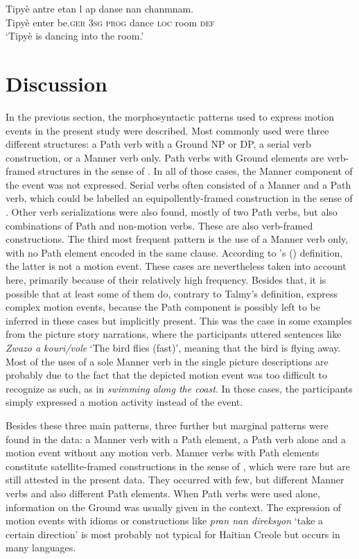 \documentclass[output=paper,colorlinks,citecolor=brown]{langscibook}
\begin{document}
\ea\label{ex:3:75}
\gll Tipyè antre etan l ap danse nan chanmnam. \\
     Tipyè enter be.\textsc{ger} \textsc{3sg} \textsc{prog} dance \textsc{loc} room \textsc{def} \\
\glt ‘Tipyè is dancing into the room.’
\z


\section{Discussion}\label{sec:3:5}

In the previous section, the morphosyntactic patterns used to express motion events in the present study were described. Most commonly used were three different structures: a Path verb with a Ground NP or DP, a serial verb construction, or a Manner verb only. Path verbs with Ground elements are verb-framed structures in the sense of \citet{Talmy_1991}. In all of those cases, the Manner component of the event was not expressed. Serial verbs often consisted of a Manner and a Path verb, which could be labelled an equipollently-framed construction in the sense of \citet{Slobin_2004}. Other verb serializations were also found, mostly of two Path verbs, but also combinations of Path and non-motion verbs. These are also verb-framed constructions. The third most frequent pattern is the use of a Manner verb only, with no Path element encoded in the same clause. According to \citeauthor{Talmy_1985}'s (\citeyear{Talmy_1985}) definition, the latter is not a motion event. These cases are nevertheless taken into account here, primarily because of their relatively high frequency. Besides that, it is possible that at least some of them do, contrary to Talmy’s definition, express complex motion events, because the Path component is possibly left to be inferred in these cases but implicitly present. This was the case in some examples from the picture story narrations, where the participants uttered sentences like \emph{Zwazo a kouri/vole} ‘The bird flies (fast)’, meaning that the bird is flying away. Most of the uses of a sole Manner verb in the single picture descriptions are probably due to the fact that the depicted motion event was too difficult to recognize as such, as in \emph{swimming along the coast}. In these cases, the participants simply expressed a motion activity instead of the event.

Besides these three main patterns, three further but marginal patterns were found in the data: a Manner verb with a Path element, a Path verb alone and a motion event without any motion verb. Manner verbs with Path elements constitute satellite-framed constructions in the sense of \citet{Talmy_1991}, which were rare but are still attested in the present data. They occurred with few, but different Manner verbs and also different Path elements. When Path verbs were used alone, information on the Ground was usually given in the context. The expression of motion events with idioms or constructions like \emph{pran nan direksyon} ‘take a certain direction’ is most probably not typical for Haitian Creole but occurs in many languages.
\end{document}
